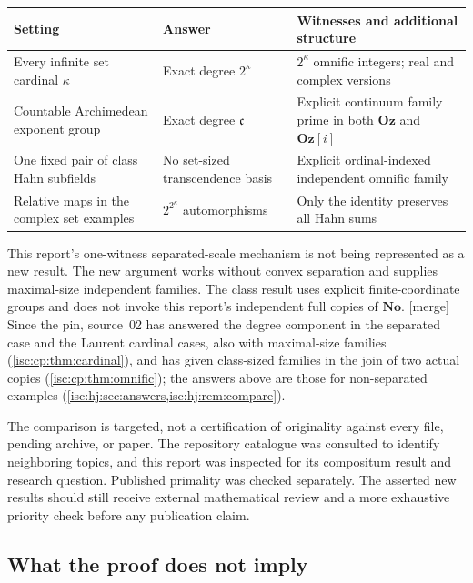 \documentclass[11pt,letterpaper]{article}
\theoremstyle{definition}
\theoremstyle{remark}
\newcommand{\No}{\mathbf{No}}
\newcommand{\Oz}{\mathbf{Oz}}
\newcommand{\mtag}{\textup{[merge]}}%
\newcommand{\cc}{\mathfrak c}
\numberwithin{equation}{section}
\begin{document}
\begin{center}
\small
\begin{tabular}{>{\raggedright\arraybackslash}p{}>{\raggedright\arraybackslash}p{}>{\raggedright\arraybackslash}p{}}
\toprule
Setting & Answer & Witnesses and additional structure\\
\midrule
Every infinite set cardinal $\kappa$ & Exact degree $2^\kappa$ &
$2^\kappa$ omnific integers; real and complex versions\\[5pt]
Countable Archimedean exponent group & Exact degree $\cc$ &
Explicit continuum family prime in both $\Oz$ and $\Oz[i]$\\[5pt]
One fixed pair of class Hahn subfields & No set-sized transcendence basis &
Explicit ordinal-indexed independent omnific family\\[5pt]
Relative maps in the complex set examples & $2^{2^\kappa}$ automorphisms &
Only the identity preserves all Hahn sums\\
\bottomrule
\end{tabular}
\end{center}

This report's one-witness separated-scale mechanism is not being
represented as a new result. The new argument works without convex
separation and supplies maximal-size independent families. The class
result uses explicit finite-coordinate groups and does not invoke this
report's independent full copies of $\No$.
\mtag{} Since the pin, source~02 has answered the degree component in the
separated case and the Laurent cardinal cases, also with maximal-size
families (\cref{isc:cp:thm:cardinal}), and has given class-sized families in
the join of two actual copies (\cref{isc:cp:thm:omnific}); the answers above
are those for non-separated examples (\cref{isc:hj:sec:answers,isc:hj:rem:compare}).

The comparison is targeted, not a certification of originality against
every file, pending archive, or paper. The repository catalogue was
consulted to identify neighboring topics, and this report was inspected
for its compositum result and research question.
Published primality was checked separately. The asserted new results
should still receive external mathematical review and a more exhaustive
priority check before any publication claim.

\subsection{What the proof does not imply}\label{isc:hj:sub:notimply}
\end{document}
